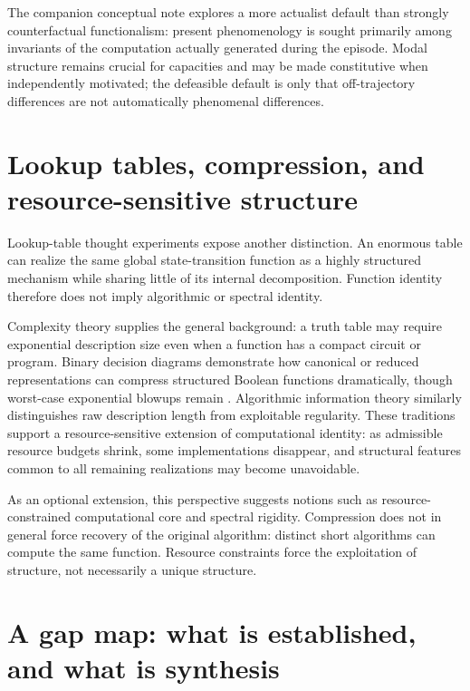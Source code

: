 \documentclass[11pt,a4paper]{article}
\begin{document}
\begin{takeawaybox}
The companion conceptual note explores a more actualist default than strongly counterfactual functionalism: present phenomenology is sought primarily among invariants of the computation actually generated during the episode. Modal structure remains crucial for capacities and may be made constitutive when independently motivated; the defeasible default is only that off-trajectory differences are not automatically phenomenal differences.
\end{takeawaybox}

\section{Lookup tables, compression, and resource-sensitive structure}

Lookup-table thought experiments expose another distinction. An enormous table can realize the same global state-transition function as a highly structured mechanism while sharing little of its internal decomposition. Function identity therefore does not imply algorithmic or spectral identity.

Complexity theory supplies the general background: a truth table may require exponential description size even when a function has a compact circuit or program. Binary decision diagrams demonstrate how canonical or reduced representations can compress structured Boolean functions dramatically, though worst-case exponential blowups remain \cite{Bryant1986}. Algorithmic information theory similarly distinguishes raw description length from exploitable regularity. These traditions support a resource-sensitive extension of computational identity: as admissible resource budgets shrink, some implementations disappear, and structural features common to all remaining realizations may become unavoidable.

As an optional extension, this perspective suggests notions such as resource-constrained computational core and spectral rigidity. Compression does not in general force recovery of the original algorithm: distinct short algorithms can compute the same function. Resource constraints force the exploitation of structure, not necessarily a unique structure.

\section{A gap map: what is established, and what is synthesis}
\end{document}
